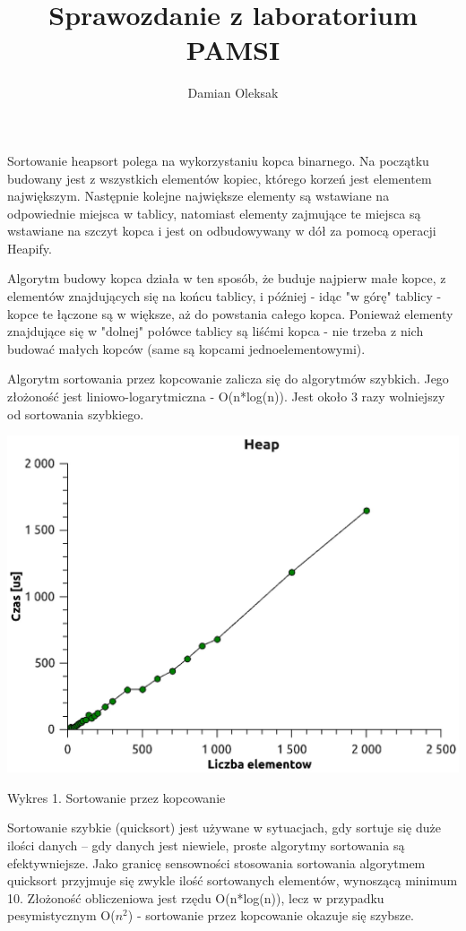 \documentclass[12pt,a4paper]{article}
\title{Sprawozdanie z laboratorium PAMSI}
\author{Damian Oleksak}
\date{}
\begin{document}
\maketitle

Sortowanie heapsort polega na wykorzystaniu kopca binarnego. Na początku budowany jest z wszystkich elementów kopiec, którego korzeń jest elementem największym. Następnie kolejne największe elementy są wstawiane na odpowiednie miejsca w tablicy, natomiast elementy zajmujące te miejsca są wstawiane na szczyt kopca i jest on odbudowywany w dół za pomocą operacji Heapify.

Algorytm budowy kopca działa w ten sposób, że buduje najpierw małe kopce, z elementów znajdujących się na końcu tablicy, i później - idąc "w górę" tablicy - kopce te łączone są w większe, aż do powstania całego kopca. Ponieważ elementy znajdujące się w "dolnej" połówce tablicy są liśćmi kopca - nie trzeba z nich budować małych kopców (same są kopcami jednoelementowymi). 

Algorytm sortowania przez kopcowanie zalicza się do algorytmów szybkich. Jego złożoność jest liniowo-logarytmiczna - O(n*log(n)). Jest około 3 razy wolniejszy od sortowania szybkiego.\newline


\includegraphics[scale=0.8]{./heap}

Wykres 1. Sortowanie przez kopcowanie \newpage

Sortowanie szybkie (quicksort) jest używane w sytuacjach, gdy sortuje się duże ilości
danych – gdy danych jest niewiele, proste algorytmy sortowania są efektywniejsze. Jako granicę
sensowności stosowania sortowania algorytmem quicksort przyjmuje się zwykle ilość sortowanych
elementów, wynoszącą minimum 10. Złożoność obliczeniowa jest rzędu O(n*log(n)), lecz w przypadku pesymistycznym O($n^{2}$) - sortowanie przez kopcowanie okazuje się szybsze.\newline
\end{document}
